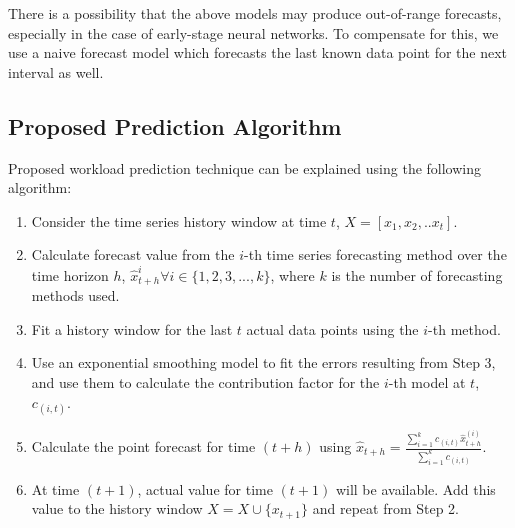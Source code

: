 There is a possibility that the above models may produce out-of-range forecasts, especially in the case of early-stage neural networks. To compensate for this, we use a naive forecast model which forecasts the last known data point for the next interval as well.

\subsection{Proposed Prediction Algorithm}
Proposed workload prediction technique can be explained using the following algorithm:
\begin{enumerate}
\item Consider the time series history window at time $t$, $X=[x_{1},x_{2},.. x_{t}]$.
\item Calculate forecast value from the $i$-th time series forecasting method over the time horizon $h$, $\hat{x}_{t+h}^{i} \forall i \in \{1,2,3,...,k\}$, where $k$ is the number of forecasting methods used.
\item Fit a history window for the last $t$ actual data points using the $i$-th method.
\item Use an exponential smoothing model to fit the errors resulting from Step 3, and use them to calculate the contribution factor for the $i$-th model at $t$, $c_{(i,t)}$.
\item Calculate the point forecast for time $(t+h)$ using
$\hat{x}_{t+h}= \frac{\sum_{i=1}^{k}c_{(i,t)} \hat{x}_{t+h}^{(i)}}{\sum_{i=1}^{k}c_{(i,t)}}$.
\item At time $(t+1)$, actual value for time $(t+1)$ will be available. Add this value to the history window $X=X\cup \{x_{t+1}\}$ and repeat from Step 2.
\end{enumerate}